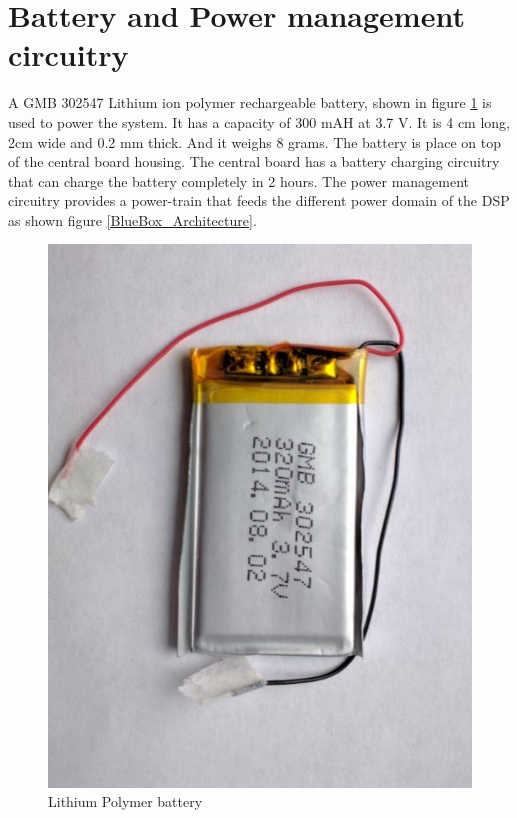 \section{Battery and Power management circuitry}
 A GMB 302547 Lithium ion polymer rechargeable battery, shown in figure \ref{fig:battery} is used to power the system. It has a capacity of 300 mAH at 3.7 V. It is 4 cm long, 2cm wide and 0.2 mm thick. And it weighs 8 grams. The battery is place on top of the central board housing. The central board has a battery charging circuitry that can charge the battery completely in 2 hours. The power management circuitry provides a power-train that feeds the different power domain of the DSP as shown figure \ref{BlueBox_Architecture}.
 \begin{figure}[h]
 	\centering
 	\includegraphics[scale = 0.25 ]{battery.JPG}
 	\caption{Lithium Polymer battery}\label{fig:battery}
 \end{figure}      


